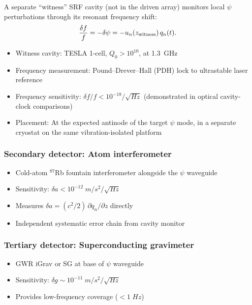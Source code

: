 \documentclass[aps,prd,twocolumn,superscriptaddress,floatfix,nofootinbib]{revtex4-2}
\begin{document}
A separate ``witness'' SRF cavity (not in the driven array) monitors
local $\psi$ perturbations through its resonant frequency shift:
\begin{equation}
\frac{\delta f}{f} = -\delta\psi = -u_n(z_{\rm witness})\,q_n(t).
\end{equation}

\begin{itemize}[nosep]
\item Witness cavity: TESLA 1-cell, $Q_0 > 10^{10}$, at 1.3~GHz
\item Frequency measurement: Pound--Drever--Hall (PDH) lock to
ultrastable laser reference
\item Frequency sensitivity: $\delta f/f < 10^{-18}/\sqrt{\si{Hz}}$
(demonstrated in optical cavity-clock comparisons)
\item Placement: At the expected antinode of the target $\psi$ mode,
in a separate cryostat on the same vibration-isolated platform
\end{itemize}

\subsubsection{Secondary detector: Atom interferometer}

\begin{itemize}[nosep]
\item Cold-atom $^{87}$Rb fountain interferometer alongside the
$\psi$ waveguide
\item Sensitivity: $\delta a < 10^{-12}\;\si{m/s^2/\sqrt{Hz}}$
\item Measures $\delta a = (c^2/2)\,\partial q_n/\partial z$ directly
\item Independent systematic error chain from cavity monitor
\end{itemize}

\subsubsection{Tertiary detector: Superconducting gravimeter}

\begin{itemize}[nosep]
\item GWR iGrav or SG at base of $\psi$ waveguide
\item Sensitivity: $\delta g \sim 10^{-11}\;\si{m/s^2/\sqrt{Hz}}$
\item Provides low-frequency coverage ($< 1\;\si{Hz}$)
\end{itemize}
\end{document}
